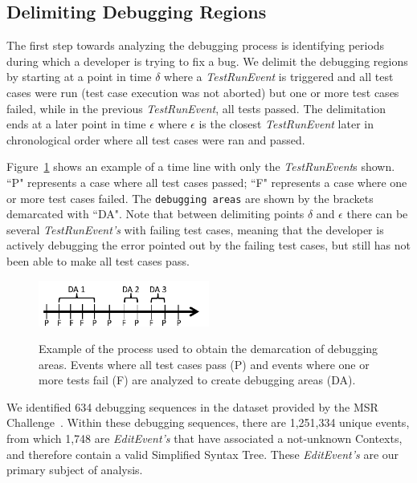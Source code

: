 \documentclass[sigconf]{acmart}
\begin{document}
\subsection{Delimiting Debugging Regions}
\label{delimitDebugRegions}


The first step towards analyzing the debugging
process is identifying periods during which a 
developer is trying to fix a bug.
We delimit the debugging regions by starting at a point
in time $\delta$ where a \textit{TestRunEvent} is triggered and 
all test cases were run (test case execution
was not aborted) but one or more test cases failed, while in the 
previous \textit{TestRunEvent}, all tests passed.
The delimitation ends at a later point in time $\epsilon $ where 
$\epsilon $ is the closest \textit{TestRunEvent} later in
chronological order
where all test cases were ran and passed.

Figure~\ref{demarcations} shows an example of a time line
with only the \textit{TestRunEvent}s shown. ``P" represents a case
where all test cases passed; ``F" represents a case where one
or more test cases failed. The \texttt{debugging areas} are shown by
the brackets demarcated with ``DA". 
Note that between delimiting points $\delta$ and $\epsilon$ there can be 
several \textit{TestRunEvent's} with failing test cases, meaning
that the developer is actively debugging the error pointed out
by the failing test cases, but still has not been able to make
all test cases pass.

\begin{figure}[h]
\caption{Example of the process used to obtain the demarcation of
debugging areas. Events where all test cases pass (P) and
events where one or more tests fail (F) are analyzed to create
debugging areas (DA).}
\centering
\includegraphics[width=0.5\textwidth]{images/demarcations.png}
\label{demarcations}
\end{figure}

We identified 634 debugging sequences in the dataset 
provided by the MSR Challenge~\cite{msr18challenge}.
Within these debugging sequences, there are 1,251,334
unique events, from which 1,748 are \textit{EditEvent's}
that have associated a not-unknown Contexts, and therefore 
contain a valid Simplified Syntax Tree. These \textit{EditEvent's} 
are our primary subject of analysis.
\end{document}
